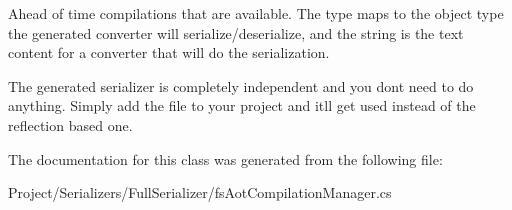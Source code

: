 Ahead of time compilations that are available. The type maps to the object type the generated converter will serialize/deserialize, and the string is the text content for a converter that will do the serialization. 

The generated serializer is completely independent and you don\textquotesingle{}t need to do anything. Simply add the file to your project and it\textquotesingle{}ll get used instead of the reflection based one. 

The documentation for this class was generated from the following file\+:\begin{DoxyCompactItemize}
\item 
Project/\+Serializers/\+Full\+Serializer/fs\+Aot\+Compilation\+Manager.\+cs\end{DoxyCompactItemize}
